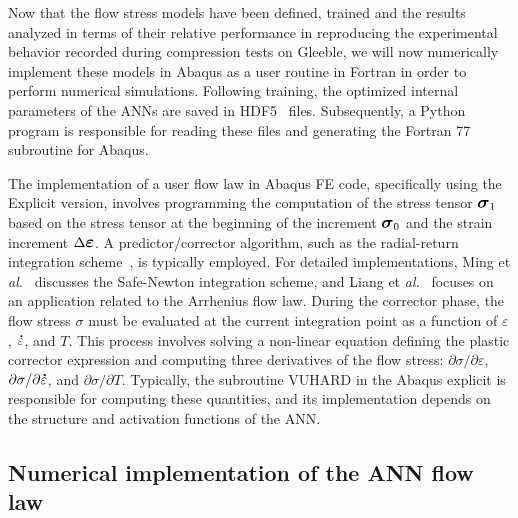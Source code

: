 \documentclass[algorithms,article,submit,pdftex,oneauthors]{Definitions/mdpi}
\makeatletter
\DeclareRobustCommand{\mdot}[1]{\accentset{\mbox{\bfseries .}}{#1}}
\DeclareRobustCommand{\eal}{et \emph{al.}\@\xspace}
\DeclareRobustCommand{\Sig}{\mbox{\large\ensuremath{\boldsymbol{\sigma}}}}
\DeclareRobustCommand{\Eps}{\mbox{\large\ensuremath{\boldsymbol{\varepsilon}}}}
\makeatother
\begin{document}
Now that the flow stress models have been defined, trained and the results analyzed in terms of their relative performance in reproducing the experimental behavior recorded during compression tests on Gleeble, we will now numerically implement these models in Abaqus as a user routine in Fortran in order to perform numerical simulations.
\textcolor{greencolor}{Following training, the optimized internal parameters of the ANNs are saved in HDF5~\cite{Koranne-2011-HDF} files.
Subsequently, a Python program is responsible for reading these files and generating the Fortran 77 subroutine for Abaqus.}

\textcolor{greencolor}{The implementation of a user flow law in Abaqus FE code, specifically using the Explicit version, involves programming the computation of the stress tensor $\Sig_{1}$ based on the stress tensor at the beginning of the increment $\Sig_{0}$ and the strain increment $\Delta\Eps$.
A predictor/corrector algorithm, such as the radial-return integration scheme~\cite{Ponthot-2002-USU}, is typically employed.
For detailed implementations, Ming \eal~\cite{Ming-2018-ERV} discusses the Safe-Newton integration scheme, and Liang \eal~\cite{Liang-2022} focuses on an application related to the Arrhenius flow law.
During the corrector phase, the flow stress $\sigma$ must be evaluated at the current integration point as a function of $\varepsilon$, $\mdot{\varepsilon}$, and $T$.
This process involves solving a non-linear equation defining the plastic corrector expression and computing three derivatives of the flow stress: $\partial\sigma/\partial\varepsilon$, $\partial\sigma/\partial\mdot{\varepsilon}$, and $\partial\sigma/\partial T$.
Typically, the subroutine VUHARD in the Abaqus explicit is responsible for computing these quantities, and its implementation depends on the structure and activation functions of the ANN.}

\subsection{Numerical implementation of the ANN flow law}\label{subsec:Num-impl}
\end{document}
